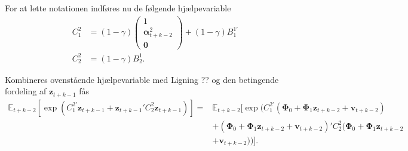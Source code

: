 \documentclass[
  a4paper,
  oneside]{memoir}
\begin{document}
For at lette notationen indføres nu de følgende hjælpevariable
\begin{align*}
C_1^2 &= (1-\gamma) \begin{pmatrix} 1\\ \bm{\alpha}_{t+k-2}^{2} \\ \bm{0} \end{pmatrix} + (1-\gamma) B_1^{1\prime}\\
C_2^2 &= (1-\gamma) B_2^1.
\end{align*}

Kombineres ovenstående hjælpevariable med Ligning ?? og den betingende fordeling af \(\bm{z}_{t+k-1}\) fås
\begin{align*}
\mathbb{E}_{t+k-2}[ \exp( C_1^{2\prime} \bm{z}_{t+k-1} + \bm{z}_{t+k-1}' C_2^2 \bm{z}_{t+k-1} ) ] = &\mathbb{E}_{t+k-2}[ \exp ( C_1^{2\prime} (\bm{\Phi}_0+\bm{\Phi}_1\bm{z}_{t+k-2} + \bm{v}_{t+k-2} )\\
                                                                                                  &+ (\bm{\Phi}_0+\bm{\Phi}_1\bm{z}_{t+k-2} + \bm{v}_{t+k-2})' C_2^2 (\bm{\Phi}_0+\bm{\Phi}_1\bm{z}_{t+k-2}\\
                                                                                                  &+ \bm{v}_{t+k-2}) ) ].
\end{align*}
\end{document}
